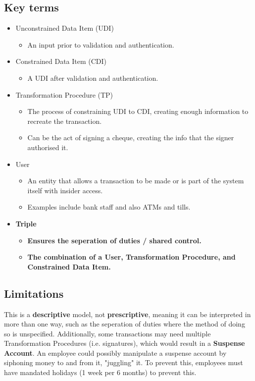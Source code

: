 \documentclass[12pt]{report}
\begin{document}
\subsection{Key terms}
\begin{itemize}
	\item Unconstrained Data Item (UDI)
	\begin{itemize}
		\item An input prior to validation and authentication.
	\end{itemize}
	\item Constrained Data Item (CDI)
	\begin{itemize}
		\item A UDI after validation and authentication.
	\end{itemize}
	\item Transformation Procedure (TP)
	\begin{itemize}
		\item The process of constraining UDI to CDI, creating enough information to recreate the transaction.
		\item \footnotesize Can be the act of signing a cheque, creating the info that the signer authorised it.
	\end{itemize}
	\item User
	\begin{itemize}
		\item An entity that allows a transaction to be made or is part of the system itself with insider access.
		\item Examples include bank staff and also ATMs and tills.
	\end{itemize}
	\item \textbf{Triple}
	\begin{itemize}
		\item \textbf{Ensures the seperation of duties / shared control.}
		\item \textbf{The combination of a User, Transformation Procedure, and Constrained Data Item.}
	\end{itemize}
\end{itemize}

\subsection{Limitations}
This is a \textbf{descriptive} model, not \textbf{prescriptive}, meaning it can be interpreted in more than one way, such as the seperation of duties 
where the method of doing so is unspecified. Additionally, some transactions may need multiple Transformation Procedures (i.e. signatures), which would result in a
\textbf{Suspense Account}. An employee could possibly manipulate a suspense account by siphoning money to and from it, "juggling" it. 
To prevent this, employees must have mandated holidays (1 week per 6 months) to prevent this.
\end{document}
